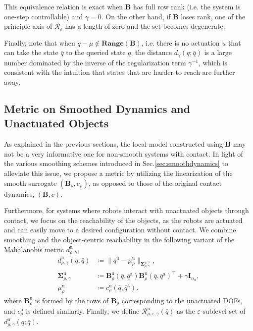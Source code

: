 This equivalence relation is exact when $\mathbf{B}$ has full row rank (i.e. the system is one-step controllable) and $\gamma=0$. On the other hand, if $\mathbf{B}$ loses rank, one of the principle axis of $\mathcal{R}_{\varepsilon}$ has a length of zero and the set becomes degenerate.

Finally, note that when $q-\mu \notin \mathbf{Range}(\mathbf{B})$, i.e. there is no actuation $u$ that can take the state $\bar{q}$ to the queried state $q$, the distance $ d_{\gamma}(q;\bar{q})$ is a large number dominated by the inverse of the regularization term $\gamma^{-1}$, which is consistent with the intuition that states that are harder to reach are further away.

\subsection{Metric on Smoothed Dynamics and Unactuated Objects}
\label{sec:smooth_metric}
As explained in the previous sections, the local model constructed using $\mathbf{B}$ may not be a very informative one for non-smooth systems with contact. In light of the various smoothing schemes introduced in Sec.\ref{sec:smoothdynamics} to alleviate this issue, we propose a metric by utilizing the linearization of the smooth surrogate $(\mathbf{B}_\rho,c_\rho)$, as opposed to those of the original contact dynamics, $(\mathbf{B},c)$. 

Furthermore, for systems where robots interact with unactuated objects through contact, we focus on the reachability of the objects, as the robots are actuated and can easily move to a desired configuration without contact. We combine smoothing and the object-centric reachability in the following variant of the Mahalanobis metric $d^\mathrm{u}_{\rho,\gamma}$, 
\begin{equation}
\label{eq:unactuated_mahalanobis_metric}
\begin{aligned}
d_{\rho,\gamma}^\mathrm{u}(q;\bar{q}) & \coloneqq \|q^\mathrm{u} - \mu^\mathrm{u}_\rho\|_{\mathbf{\Sigma}^{\mathrm{u}^{-1}}_{\rho,\gamma}}, \\
\mathbf{\Sigma}_{\rho,\gamma}^\mathrm{u} & \coloneqq \mathbf{B}^\mathrm{u}_\rho(\bar{q},\bar{q}^\mathrm{a})\mathbf{B}^\mathrm{u}_\rho(\bar{q},\bar{q}^\mathrm{a})^\intercal + \gamma\mathbf{I}_{n_\mathrm{u}},\\ 
\mu_\rho^\mathrm{u} & \coloneqq c_\rho^\mathrm{u}(\bar{q},\bar{q}^\mathrm{a}).
\end{aligned}
\end{equation}
where $\mathbf{B}^\mathrm{u}_\rho$ is formed by the rows of $\mathbf{B}_\rho$ corresponding to the unactuated DOFs, and $c_\rho^\mathrm{u}$ is defined similarly. Finally, we define $\mathcal{R}_{\rho,\varepsilon,\gamma}^\mathrm{u}(\bar{q})$ as the $\varepsilon$-sublevel set of $d^\mathrm{u}_{\rho,\gamma}(q;\bar{q})$. 

